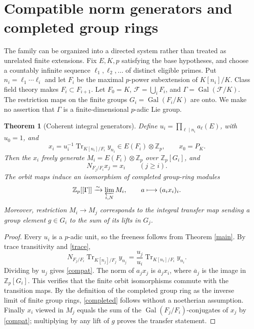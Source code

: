 \documentclass[11pt,a4paper]{article}
\newtheorem{theorem}{Theorem}[section]\newtheorem{proposition}[theorem]{Proposition}\newtheorem{lemma}[theorem]{Lemma}\newtheorem{corollary}[theorem]{Corollary}\theoremstyle{definition}\newtheorem{definition}[theorem]{Definition}\theoremstyle{remark}\newtheorem{remark}[theorem]{Remark}
\newcommand{\Zp}{\mathbb Z_p}\newcommand{\Qp}{\mathbb Q_p}\newcommand{\Fp}{\mathbb F_p}\newcommand{\Q}{\mathbb Q}\newcommand{\Sha}{\operatorname{Sha}}\newcommand{\Sel}{\operatorname{Sel}}\newcommand{\Gal}{\operatorname{Gal}}\newcommand{\Tr}{\operatorname{Tr}}\newcommand{\rk}{\operatorname{rank}}\newcommand{\ord}{\operatorname{ord}}\newcommand{\Hom}{\operatorname{Hom}}\newcommand{\SL}{\operatorname{SL}}\newcommand{\GL}{\operatorname{GL}}\newcommand{\coker}{\operatorname{coker}}\newcommand{\length}{\operatorname{length}}\newcommand{\res}{\operatorname{res}}\newcommand{\cor}{\operatorname{cor}}\newcommand{\Id}{\operatorname{id}}
\numberwithin{equation}{section}
\begin{document}
\section{Compatible norm generators and completed group rings}\label{tower}
The family can be organized into a directed system rather than treated as unrelated finite extensions. Fix $E,K,p$ satisfying the base hypotheses, and choose a countably infinite sequence $\ell_1,\ell_2,\ldots$ of distinct eligible primes. Put $n_i=\ell_1\cdots\ell_i$ and let $F_i$ be the maximal $p$-power subextension of $K[n_i]/K$. Class field theory makes $F_i\subset F_{i+1}$. Let $F_0=K$, $\mathcal F=\bigcup_iF_i$, and $\Gamma=\Gal(\mathcal F/K)$. The restriction maps on the finite groups $G_i=\Gal(F_i/K)$ are onto. We make no assertion that $\Gamma$ is a finite-dimensional $p$-adic Lie group.
\begin{theorem}[Coherent integral generators]\label{coherent}
Define $u_i=\prod_{\ell\mid n_i}a_\ell(E)$, with $u_0=1$, and
\begin{equation}\label{normalized}
x_i=u_i^{-1}\Tr_{K[n_i]/F_i}y_{n_i}\in E(F_i)\otimes\Zp,
\qquad x_0=P_K.
\end{equation}
Then the $x_i$ freely generate $M_i=E(F_i)\otimes\Zp$ over $\Zp[G_i]$, and
\begin{equation}\label{compat}
N_{F_j/F_i}x_j=x_i\qquad(j\ge i).
\end{equation}
The orbit maps induce an isomorphism of completed group-ring modules
\begin{equation}\label{completed}
\Zp[[\Gamma]]\xrightarrow{\sim}\varprojlim_{i,N} M_i,
\qquad a\longmapsto (a_i x_i)_i.
\end{equation}
Moreover, restriction $M_i\to M_j$ corresponds to the integral transfer map sending a group element $g\in G_i$ to the sum of its lifts in $G_j$.
\end{theorem}
\begin{proof}
Every $u_i$ is a $p$-adic unit, so the freeness follows from Theorem \ref{main}. By trace transitivity and \eqref{trace},
\[ N_{F_j/F_i}\Tr_{K[n_j]/F_j}y_{n_j}
=\frac{u_j}{u_i}\Tr_{K[n_i]/F_i}y_{n_i}. \]
Dividing by $u_j$ gives \eqref{compat}. The norm of $a_jx_j$ is $\overline a_j x_i$, where $\overline a_j$ is the image in $\Zp[G_i]$. This verifies that the finite orbit isomorphisms commute with the transition maps. By the definition of the completed group ring as the inverse limit of finite group rings, \eqref{completed} follows without a noetherian assumption. Finally $x_i$ viewed in $M_j$ equals the sum of the $\Gal(F_j/F_i)$-conjugates of $x_j$ by \eqref{compat}; multiplying by any lift of $g$ proves the transfer statement.
\end{proof}
\end{document}
